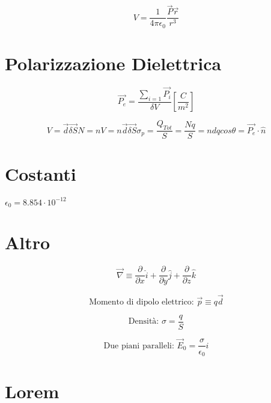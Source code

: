 \documentclass[a4paper,11pt]{article}
\begin{document}
\begin{multicols}{3}
		\begin{equation}
			V = \frac{1}{4 \pi \epsilon_0} \frac{\vec{P}\vec{r}}{r^3}
		\end{equation}
	
		\section{Polarizzazione Dielettrica}
		\begin{equation}
			\vec{P_e} = \frac{\sum_{i=1}\vec{P_i}}{\delta V} \left[\frac{C}{m^2}\right]
		\end{equation}
	
		\begin{equation}
			V = \vec{d} \vec{\delta S}
			N = nV = n\vec{d} \vec{\delta S}
			\sigma_p = \frac{Q_{Tot}}{S} = \frac{Nq}{S} = ndqcos\theta = \vec{P_e} \cdot \hat{n}
		\end{equation}
	
	
	
	
	
	
	
	
	
	
		
		
		\section{Costanti}
		$\epsilon_{0}=8.854 \cdot 10^{-12}$
		
		
		
		\section{Altro}
		
		\begin{equation}
			\vec{\nabla} \equiv
			\frac{\partial}{\partial x}\hat{i} +
			\frac{\partial}{\partial y}\hat{j} +
			\frac{\partial}{\partial z}\hat{k}
		\end{equation}
		
		\begin{equation}
			\text{Momento di dipolo elettrico: }\vec{p} \equiv q \vec{d}
		\end{equation}
		
		\begin{equation}
			\text{Densità: } \sigma = \frac{q}{S}
		\end{equation}
		
		\begin{equation}
			\text{Due piani paralleli: }\vec{E}_0 = \frac{\sigma}{\epsilon_0} \hat{i}
		\end{equation}
		
		
		
		
		
		\section{Lorem}
		\lipsum[1-10]
	\end{multicols}
	
\end{document}
